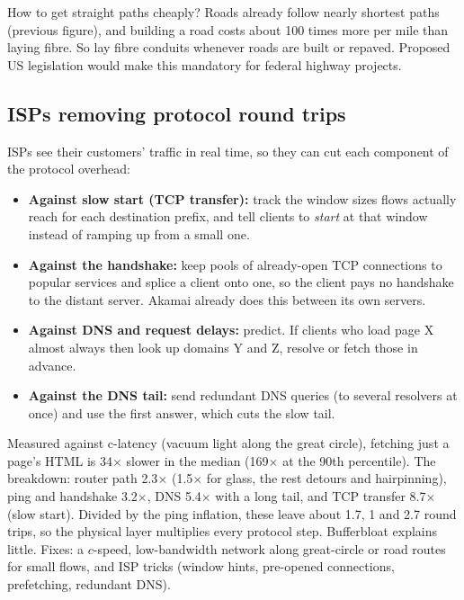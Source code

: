 How to get straight paths cheaply? Roads already follow nearly shortest paths (previous figure), and building a road costs about 100 times more per mile than
laying fibre. So lay fibre conduits whenever roads are built or repaved. Proposed US legislation would make this mandatory for federal highway projects.

\subsection{ISPs removing protocol round trips}
ISPs see their customers' traffic in real time, so they can cut each component of the protocol overhead:
\begin{itemize}
  \item \textbf{Against slow start (TCP transfer):} track the window sizes flows actually reach for each destination prefix, and tell clients to \emph{start} at
        that window instead of ramping up from a small one.
  \item \textbf{Against the handshake:} keep pools of already-open TCP connections to popular services and splice a client onto one, so the client pays no handshake to
        the distant server. Akamai already does this between its own servers.
  \item \textbf{Against DNS and request delays:} predict. If clients who load page X almost always then look up domains Y and Z, resolve or fetch those in advance.
  \item \textbf{Against the DNS tail:} send redundant DNS queries (to several resolvers at once) and use the first answer, which cuts the slow tail.
\end{itemize}

\begin{keybox}
Measured against c-latency (vacuum light along the great circle), fetching just a page's HTML is 34$\times$ slower in the median (169$\times$ at the 90th
percentile). The breakdown: router path 2.3$\times$ (1.5$\times$ for glass, the rest detours and hairpinning), ping and handshake 3.2$\times$, DNS 5.4$\times$
with a long tail, and TCP transfer 8.7$\times$ (slow start). Divided by the ping inflation, these leave about 1.7, 1 and 2.7 round trips, so the physical layer
multiplies every protocol step. Bufferbloat explains little. Fixes: a $c$-speed, low-bandwidth network along great-circle or road routes for small flows, and ISP
tricks (window hints, pre-opened connections, prefetching, redundant DNS).
\end{keybox}

